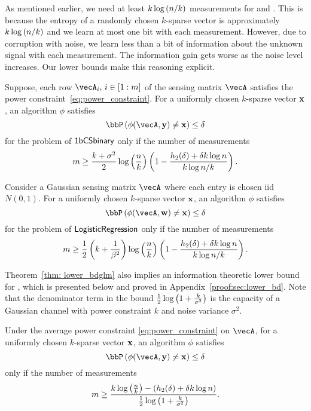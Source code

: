 As mentioned earlier, we need at least $k\log\left(n/k\right)$ measurements for \bcs and \logreg. This is because the entropy of a randomly chosen $k$-sparse vector is approximately $k\log\left(n/k\right)$ and we learn at most one bit with each measurement. However, due to corruption with noise, we learn less than a bit of information about the unknown signal with each measurement. The information gain gets worse as the noise level increases. 
Our lower bounds make this reasoning explicit.  
\begin{corollary}\label{thm: lower_bd_bcs} Suppose, each row $\vecA_i, \, i\in [1:m]$ of the sensing matrix $\vecA$ satisfies the power constraint~\eqref{eq:power_constraint}.
For a uniformly chosen $k$-sparse vector $\mathbf{x}$, an algorithm $\phi$ satisfies $$\bbP\inp{\phi(\vecA, {\by}) \neq \bx}\leq \delta$$ for the problem of $\mathsf{1bCSbinary}$ only if the number of measurements $$m\geq \frac{k+\sigma^2}{2}\log\left(\frac{n}{k}\right)\left(1 - \frac{h_2(\delta) + \delta k\log{n}}{k\log{n/k}}\right).$$ 
\end{corollary}

\begin{corollary}\label{thm: lower_bd_log_reg} Consider a Gaussian  sensing matrix $\vecA$ where each entry is chosen iid $N(0,1)$.
For a uniformly chosen $k$-sparse vector $\mathbf{x}$, an algorithm $\phi$ satisfies $$\bbP\inp{\phi(\vecA, \bw) \neq \bx}\leq \delta$$ for the problem of $\mathsf{LogisticRegression}$ only if the number of measurements $$m\geq \frac{1}{2}\left(k+\frac{1}{\beta^2}\right)\log\left(\frac{n}{k}\right)\left(1 - \frac{h_2(\delta) + \delta k\log{n}}{k\log{n/k}}\right).$$ 
\end{corollary}



Theorem~\ref{thm: lower_bdglm} also implies an information theoretic lower bound for \spl, which is presented below and proved in Appendix~\ref{proof:sec:lower_bd}. Note that the denominator term in the bound $\frac{1}{2}\log\left(1+\frac{k}{\sigma^2}\right)$ is the capacity of a Gaussian channel with power constraint $k$ and noise variance $\sigma^2$. 
\begin{corollary}\label{thm: spl_lower_bd_1}
Under the average power constraint \eqref{eq:power_constraint} on  $\vecA$, for a uniformly chosen $k$-sparse vector $\mathbf{x}$, an algorithm $\phi$ satisfies $$\bbP\inp{\phi(\vecA, {\by}) \neq \bx}\leq \delta$$ only if the number of measurements
$$m\geq \frac{k\log\left(\frac{n}{k}\right)-\left(h_2(\delta) + \delta k\log{n}\right)}{\frac{1}{2}\log\left(1+\frac{k}{\sigma^2}\right)}.$$
\end{corollary} 

